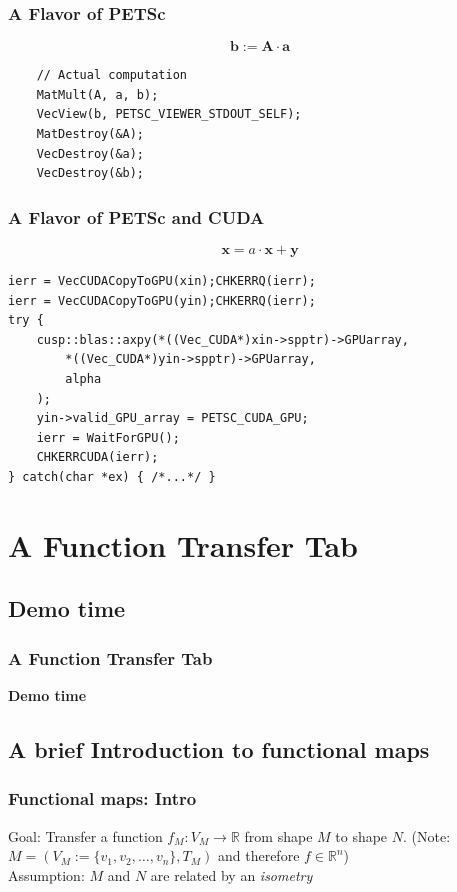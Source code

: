 \documentclass[compress]{beamer}
\begin{document}
\begin{frame}[fragile]
\frametitle{A Flavor of PETSc}
$$
	\mathbf{b} := \mathbf{A} \cdot \mathbf{a}
$$
\begin{lstlisting}
    // Actual computation
    MatMult(A, a, b);
    VecView(b, PETSC_VIEWER_STDOUT_SELF);
    MatDestroy(&A);
    VecDestroy(&a);
    VecDestroy(&b);
\end{lstlisting}

\end{frame}

\begin{frame}[fragile]
\frametitle{A Flavor of PETSc and CUDA}
$$
	\mathbf{x} = a \cdot \mathbf{x} + \mathbf{y}
$$
\begin{lstlisting}
ierr = VecCUDACopyToGPU(xin);CHKERRQ(ierr);
ierr = VecCUDACopyToGPU(yin);CHKERRQ(ierr);
try {
    cusp::blas::axpy(*((Vec_CUDA*)xin->spptr)->GPUarray,
        *((Vec_CUDA*)yin->spptr)->GPUarray,
        alpha
    );
    yin->valid_GPU_array = PETSC_CUDA_GPU;
    ierr = WaitForGPU();
    CHKERRCUDA(ierr);
} catch(char *ex) { /*...*/ }
\end{lstlisting}

\end{frame}

\section{A Function Transfer Tab}
\subsection{Demo time}
\begin{frame}[fragile]
\frametitle{A Function Transfer Tab}
\bf{Demo time}
\end{frame}

\subsection{A brief Introduction to functional maps}
\begin{frame}
\frametitle{Functional maps: Intro}
Goal: Transfer a function $f_M:V_M \to \mathbb{R}$ from shape $M$ to shape $N$. (Note: $M = (V_M:=\{v_1, v_2, \dots, v_n\}, T_M)$ and therefore $f \in \mathbb{R}^n$)\\
Assumption: $M$ and $N$ are related by an \emph{isometry}
\end{frame}
\end{document}
